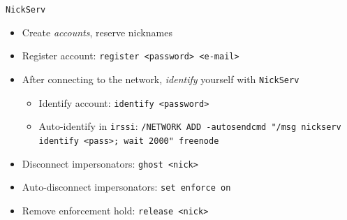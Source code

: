 \documentclass{beamer}
\begin{document}
\begin{frame}{\texttt{NickServ}}
\begin{itemize}
	\item Create \emph{accounts}, reserve nicknames
	\item Register account: \texttt{register <password> <e-mail>}
	\item After connecting to the network, \emph{identify} yourself with \texttt{NickServ}
	\begin{itemize}
		\item Identify account: \texttt{identify <password>}
		\item Auto-identify in \texttt{irssi}: \texttt{/NETWORK ADD -autosendcmd "/msg nickserv identify <pass>; wait 2000" freenode}
	\end{itemize}
	\item Disconnect impersonators: \texttt{ghost <nick>}
	\item Auto-disconnect impersonators: \texttt{set enforce on}
	\item Remove enforcement hold: \texttt{release <nick>}

\end{itemize}
\end{frame}
\end{document}
